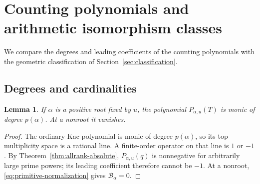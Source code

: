 \documentclass[11pt, reqno]{amsart}
\numberwithin{equation}{section}
\newtheorem{lemma}[theorem]{Lemma}
\theoremstyle{definition}
\theoremstyle{remark}
\newcommand{\mc}[1]{\mathcal{#1}}
\begin{document}
\section{Counting polynomials and arithmetic isomorphism classes}\label{sec:polynomial-strata}
We compare the degrees and leading coefficients of the counting
polynomials with the geometric classification of Section~\ref{sec:classification}.

\subsection{Degrees and cardinalities}

\begin{lemma}\label{lem:leading-action}
If $\alpha$ is a positive root fixed by $u$, the polynomial
$P_{\alpha,u}(T)$ is monic of degree $p(\alpha)$. At a nonroot
it vanishes.
\end{lemma}
\begin{proof}
The ordinary Kac polynomial is monic of degree $p(\alpha)$, so its
top multiplicity space is a rational line. A finite-order operator
on that line is $1$ or $-1$. By Theorem~\ref{thm:allrank-absolute},
$P_{\alpha,u}(q)$ is nonnegative for arbitrarily large prime powers;
its leading coefficient therefore cannot be $-1$. At a nonroot,
\eqref{eq:primitive-normalization} gives $\mc B_\alpha=0$.
\end{proof}
\end{document}
